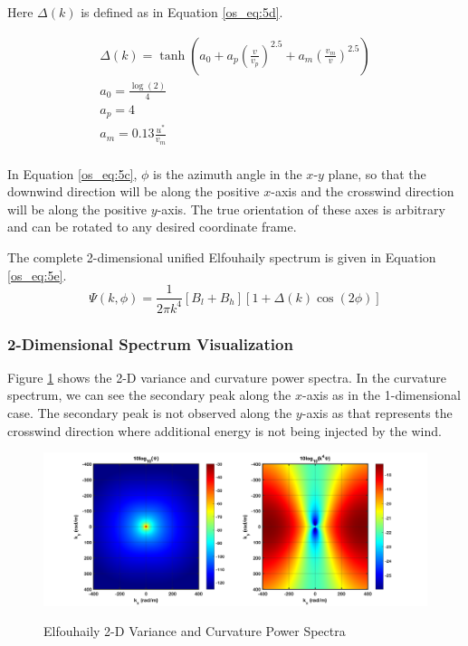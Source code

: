 \noindent Here $\Delta(k)$ is defined as in Equation \ref{os_eq:5d}.

\begin{equation}
\label{os_eq:5d}
\begin{gathered}
\Delta(k) = \tanh\left( a_0 + a_p\left(\frac{v}{v_p}\right)^{2.5}  + a_m\left(\frac{v_m}{v} \right)^{2.5}\right)\\
a_0 = \frac{\log(2)}{4} \\
a_p = 4\\
a_m = 0.13\frac{u^*}{v_m} \\
\end{gathered}
\end{equation}
\renewcommand{\baselinestretch}{2} \small\normalsize

In Equation \ref{os_eq:5c}, $\phi$ is the azimuth angle in the $x$-$y$ plane, so that the downwind direction will be along the positive $x$-axis and the crosswind direction will be along the positive $y$-axis. The true orientation of these axes is arbitrary and can be rotated to any desired coordinate frame.

The complete 2-dimensional unified Elfouhaily spectrum is given in Equation \ref{os_eq:5e}.
\begin{equation}
\label{os_eq:5e}
\boxed{\Psi(k,\phi) = \frac{1}{2\pi k^4}\left[B_l + B_h \right] \left[1 + \Delta(k)\cos(2\phi) \right]}
\end{equation}

\subsubsection{2-Dimensional Spectrum Visualization}
Figure \ref{os_fig:7bb} shows the 2-D variance and curvature power spectra. In the curvature spectrum, we can see the secondary peak along the $x$-axis as in the 1-dimensional case. The secondary peak is not observed along the $y$-axis as that represents the crosswind direction where additional energy is not being injected by the wind.

\begin{figure}[H]
  \begin{center}
\includegraphics[width=6.5in]{../media/Ocean_Surface/elf_variance_curvature_spectrum_2D.png}
  \end{center}
  \renewcommand{\baselinestretch}{1} \small\normalsize
  \begin{quote}
    \caption[Elfouhaily 2-D Variance and Curvature Power Spectra]{Elfouhaily 2-D Variance and Curvature Power Spectra\label{os_fig:7bb}}
  \end{quote}
\end{figure}
\renewcommand{\baselinestretch}{2} \small\normalsize

